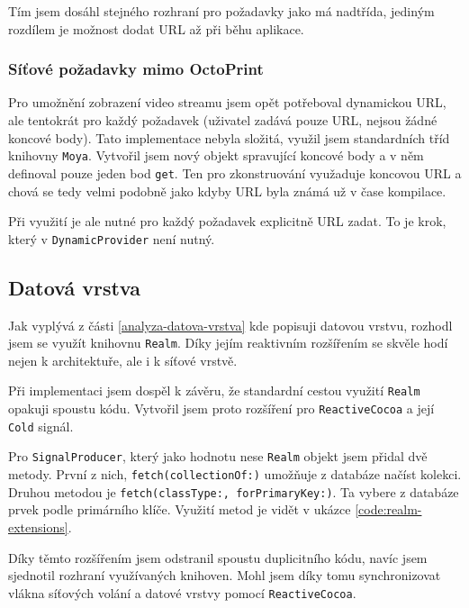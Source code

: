 Tím jsem dosáhl stejného rozhraní pro požadavky jako má nadtřída, jediným rozdílem je možnost dodat URL až při běhu aplikace.

\subsubsection*{Síťové požadavky mimo OctoPrint}

Pro umožnění zobrazení video streamu jsem opět potřeboval dynamickou URL, ale tentokrát pro každý požadavek (uživatel zadává pouze URL, nejsou žádné koncové body).
Tato implementace nebyla složitá, využil jsem standardních tříd knihovny \texttt{Moya}.
Vytvořil jsem nový objekt spravující koncové body a v něm definoval pouze jeden bod \texttt{get}.
Ten pro zkonstruování využaduje koncovou URL a chová se tedy velmi podobně jako kdyby URL byla známá už v čase kompilace.

Při využití je ale nutné pro každý požadavek explicitně URL zadat.
To je krok, který v \texttt{DynamicProvider} není nutný.

\subsection{Datová vrstva}

Jak vyplývá z části \ref{analyza-datova-vrstva} kde popisuji datovou vrstvu, rozhodl jsem se využít knihovnu \texttt{Realm}.
Díky jejím reaktivním rozšířením se skvěle hodí nejen k architektuře, ale i k síťové vrstvě.

Při implementaci jsem dospěl k závěru, že standardní cestou využití \texttt{Realm} opakuji spoustu kódu.
Vytvořil jsem proto rozšíření pro \texttt{ReactiveCocoa} a její \texttt{Cold} signál.

Pro \texttt{SignalProducer}, který jako hodnotu nese \texttt{Realm} objekt jsem přidal dvě metody.
První z nich, \texttt{fetch(collectionOf:)} umožňuje z databáze načíst kolekci.
Druhou metodou je \texttt{fetch(classType:, forPrimaryKey:)}.
Ta vybere z databáze prvek podle primárního klíče.
Využití metod je vidět v ukázce \ref{code:realm-extensions}.


Díky těmto rozšířením jsem odstranil spoustu duplicitního kódu, navíc jsem sjednotil rozhraní využívaných knihoven.
Mohl jsem díky tomu synchronizovat vlákna síťových volání a datové vrstvy pomocí \texttt{ReactiveCocoa}.

